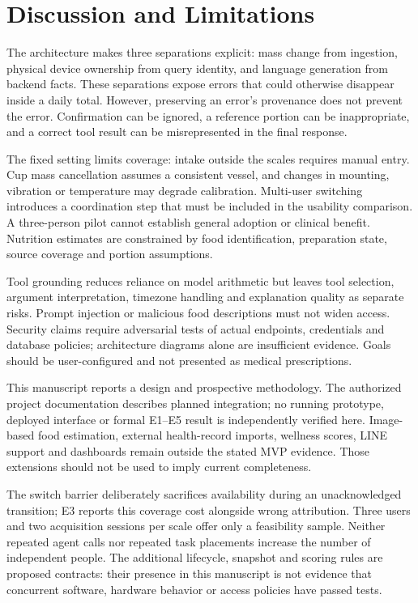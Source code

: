 \documentclass[conference]{IEEEtran}
\providecommand{\DIFadd}[1]{{\protect\color{blue} \sf #1}} %
\providecommand{\DIFaddbegin}{} %
\begin{document}
\section{Discussion and Limitations}\label{sec:discussion}
The architecture makes three separations explicit: mass change from ingestion, physical device ownership from query identity, and language generation from backend facts. These separations expose errors that could otherwise disappear inside a daily total. However, preserving an error's provenance does not prevent the error. Confirmation can be ignored, a reference portion can be inappropriate, and a correct tool result can be misrepresented in the final response.

The fixed setting limits coverage: intake outside the scales requires manual entry. Cup mass cancellation assumes a consistent vessel, and changes in mounting, vibration or temperature may degrade calibration. Multi-user switching introduces a coordination step that must be included in the usability comparison. A three-person pilot cannot establish general adoption or clinical benefit. Nutrition estimates are constrained by food identification, preparation state, source coverage and portion assumptions.

Tool grounding reduces reliance on model arithmetic but leaves tool selection, argument interpretation, timezone handling and explanation quality as separate risks. Prompt injection or malicious food descriptions must not widen access. Security claims require adversarial tests of actual endpoints, credentials and database policies; architecture diagrams alone are insufficient evidence. Goals should be user-configured and not presented as medical prescriptions.

This manuscript reports a design and prospective methodology. The authorized project documentation describes planned integration; no running prototype, deployed interface or formal E1--E5 result is independently verified here. Image-based food estimation, external health-record imports, wellness scores, LINE support and dashboards remain outside the stated MVP evidence. Those extensions should not be used to imply current completeness.

\DIFaddbegin \DIFadd{The switch barrier deliberately sacrifices availability during an unacknowledged transition; E3 reports this coverage cost alongside wrong attribution. Three users and two acquisition sessions per scale offer only a feasibility sample. Neither repeated agent calls nor repeated task placements increase the number of independent people. The additional lifecycle, snapshot and scoring rules are proposed contracts: their presence in this manuscript is not evidence that concurrent software, hardware behavior or access policies have passed tests.
}
\end{document}
